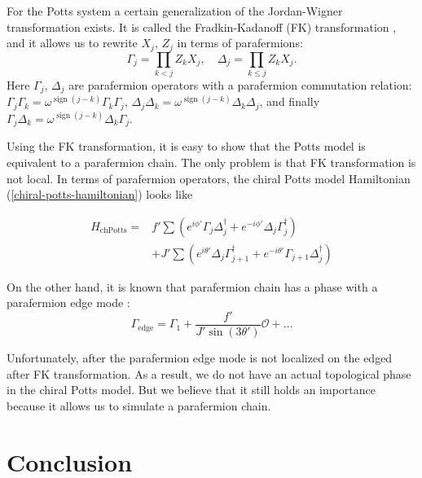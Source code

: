 \documentclass[reprint, aps, prx, amsmath, amssymb, longbibliography, superscriptaddress]{revtex4-2}
\DeclareMathOperator{\sgn}{sign}
\begin{document}
For the Potts system a certain generalization of the Jordan-Wigner transformation exists. It is called the Fradkin-Kadanoff (FK) transformation \cite{fradkin_disorder_1980}, and it allows us to rewrite $X_j, \, Z_j$ in terms of parafermions:
\begin{equation}
\Gamma_j = \prod\limits_{k<j} Z_k X_j , \quad \Delta_j = \prod\limits_{k\le j} Z_k X_j.
\end{equation}
Here $\Gamma_j, \, \Delta_j$ are parafermion operators with a parafermion commutation relation: $\Gamma_j \Gamma_k = \omega^{\sgn(j-k)} \Gamma_k \Gamma_j, \, \Delta_j \Delta_k = \omega^{\sgn(j-k)} \Delta_k \Delta_j$, and finally $\Gamma_j \Delta_k = \omega^{\sgn(j-k)} \Delta_k \Gamma_j$.

Using the FK transformation, it is easy to show that the Potts model is equivalent to a parafermion chain. The only problem is that FK transformation is not local. In terms of parafermion operators, the chiral Potts model Hamiltonian (\ref{chiral-potts-hamiltonian}) looks like 


\begin{equation}
\begin{aligned}
    H_{\text{chPotts}} = &f' \sum \left( e^{i\phi'} \Gamma_j \Delta_j^{\dagger} + e^{-i\phi'} \Delta_j \Gamma_j^{\dagger}\right) \\
    &+J' \sum \left(e^{i\theta'} \Delta_j \Gamma_{j+1}^{\dagger} + e^{-i\theta'} \Gamma_{j+1} \Delta_j^{\dagger}\right)
\end{aligned}
\end{equation}



On the other hand, it is known that parafermion chain has a phase with a parafermion edge mode  \cite{fendley_parafermionic_2012}:
\begin{equation}
\Gamma_{\text{edge}} = \Gamma_1 + \frac{f'}{J' \sin(3\theta')} \mathcal{O} + \dots
\end{equation}

Unfortunately, after the parafermion edge mode is not localized on the edged after FK transformation. As a result, we do not have an actual topological phase in the chiral Potts model. But we believe that it still holds an importance because it allows us to simulate a parafermion chain.



\section{Conclusion}
\end{document}
